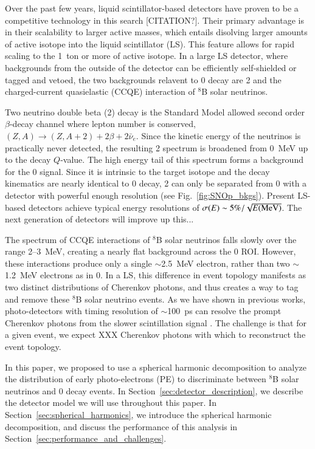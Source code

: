 Over the past few years, liquid scintillator-based detectors have
proven to be a competitive technology in this search
[CITATION?]. Their primary advantage is in their scalability to larger
active masses, which entails disolving larger amounts of active
isotope into the liquid scintillator (LS). This feature allows for
rapid scaling to the 1~ton or more of active isotope. In a large LS
detector, where backgrounds from the outside of the detector can be
efficiently self-shielded or tagged and vetoed, the two backgrounds
relavent to 0{\nbb} decay are 2{\nbb} and the charged-current
quasielastic (CCQE) interaction of $^{8}$B solar neutrinos.

Two neutrino double beta (2{\nbb}) decay is the Standard Model allowed
second order $\beta$-decay channel where lepton number is conserved,
\mbox{$(Z,A)\rightarrow(Z,A+2)+2\beta+2\bar\nu_e$}. Since the kinetic
energy of the neutrinos is practically never detected, the resulting
2{\nbb} spectrum is broadened from 0~MeV up to the decay
$Q$-value. The high energy tail of this spectrum forms a background
for the 0{\nbb} signal. Since it is intrinsic to the target isotope
and the decay kinematics are nearly identical to 0{\nbb} decay,
2{\nbb} can only be separated from 0{\nbb} with a detector with
powerful enough resolution (see Fig.~\ref{fig:SNOp_bkgs}). Present
LS-based detectors achieve typical energy resolutions of
\mbox{$\sigma(E)\sim 5\%/\sqrt{E(\rm MeV)}$}. The next generation of
detectors will improve up this... 

The spectrum of CCQE interactions of $^{8}$B solar neutrinos falls
slowly over the range 2--3~MeV, creating a nearly flat background
across the 0{\nbb} ROI. However, these interactions produce only a
single $\sim$2.5~MeV electron, rather than two $\sim$1.2~MeV electrons
as in 0{\nbb}. In a LS, this difference in event topology manifests as
two distinct distributions of Cherenkov photons, and thus creates a
way to tag and remove these $^{8}$B solar neutrino events. As we have
shown in previous works, photo-detectors with timing resolution of
$\sim$100~ps can resolve the prompt Cherenkov photons from the slower
scintillation signal \cite{Aberle2014}. The challenge is that for a
given event, we expect XXX Cherenkov photons with which to reconstruct
the event topology.

In this paper, we proposed to use a spherical harmonic decomposition
to analyze the distribution of early photo-electrons (PE) to
discriminate between $^{8}$B solar neutrinos and 0{\nbb} decay
events. In Section~\ref{sec:detector_description}, we describe the
detector model we will use throughout this paper. In
Section~\ref{sec:spherical_harmonics}, we introduce the spherical
harmonic decomposition, and discuss the performance of this analysis
in Section~\ref{sec:performance_and_challenges}.




